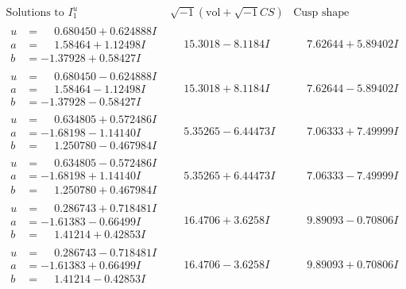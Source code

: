 \documentclass[1p]{elsarticle_modified}
\theoremstyle{definition}
\newcommand{\I}{\sqrt{-1}}
\begin{document}
$$\begin{array}{c|c|c}  
\text{Solutions to }I^u_{1}& \I (\text{vol} + \sqrt{-1}CS) & \text{Cusp shape}\\
 \hline 
\begin{aligned}
u &= \phantom{-}0.680450 + 0.624888 I \\
a &= \phantom{-}1.58464 + 1.12498 I \\
b &= -1.37928 + 0.58427 I\end{aligned}
 & \phantom{-}15.3018 - 8.1184 I & \phantom{-}7.62644 + 5.89402 I \\ \hline\begin{aligned}
u &= \phantom{-}0.680450 - 0.624888 I \\
a &= \phantom{-}1.58464 - 1.12498 I \\
b &= -1.37928 - 0.58427 I\end{aligned}
 & \phantom{-}15.3018 + 8.1184 I & \phantom{-}7.62644 - 5.89402 I \\ \hline\begin{aligned}
u &= \phantom{-}0.634805 + 0.572486 I \\
a &= -1.68198 - 1.14140 I \\
b &= \phantom{-}1.250780 - 0.467984 I\end{aligned}
 & \phantom{-}5.35265 - 6.44473 I & \phantom{-}7.06333 + 7.49999 I \\ \hline\begin{aligned}
u &= \phantom{-}0.634805 - 0.572486 I \\
a &= -1.68198 + 1.14140 I \\
b &= \phantom{-}1.250780 + 0.467984 I\end{aligned}
 & \phantom{-}5.35265 + 6.44473 I & \phantom{-}7.06333 - 7.49999 I \\ \hline\begin{aligned}
u &= \phantom{-}0.286743 + 0.718481 I \\
a &= -1.61383 - 0.66499 I \\
b &= \phantom{-}1.41214 + 0.42853 I\end{aligned}
 & \phantom{-}16.4706 + 3.6258 I & \phantom{-}9.89093 - 0.70806 I \\ \hline\begin{aligned}
u &= \phantom{-}0.286743 - 0.718481 I \\
a &= -1.61383 + 0.66499 I \\
b &= \phantom{-}1.41214 - 0.42853 I\end{aligned}
 & \phantom{-}16.4706 - 3.6258 I & \phantom{-}9.89093 + 0.70806 I \\ \hline\begin{aligned}

\end{aligned}
\end{array}$$
\end{document}

